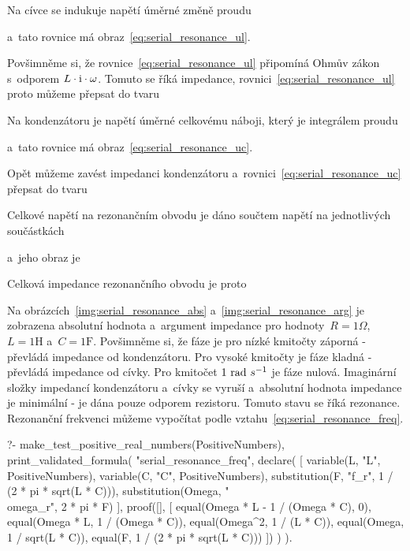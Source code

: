 
Na cívce se indukuje napětí úměrné změně proudu


a~tato rovnice má obraz~\eqref{eq:serial_resonance_ul}.


Povšimněme si, že rovnice~\eqref{eq:serial_resonance_ul} připomíná Ohmův zákon s~odporem \(L \cdot \mathrm{i} \cdot \omega\). Tomuto  se říká impedance, rovnici~\eqref{eq:serial_resonance_ul} proto můžeme přepsat do tvaru


Na kondenzátoru je napětí úměrné celkovému náboji, který je integrálem proudu


a~tato rovnice má obraz~\eqref{eq:serial_resonance_uc}.


Opět můžeme zavést impedanci kondenzátoru a~rovnici~\eqref{eq:serial_resonance_uc} přepsat do tvaru


Celkové napětí na rezonančním obvodu je dáno součtem napětí na jednotlivých součástkách


a~jeho obraz je


Celková impedance rezonančního obvodu je proto


Na obrázcích~\ref{img:serial_resonance_abs} a~\ref{img:serial_resonance_arg} je zobrazena absolutní hodnota a~argument impedance pro hodnoty~\(R = 1\Omega\), \(L = 1\mathrm{H}\) a~\(C = 1\mathrm{F}\). Povšimněme si, že fáze je pro nízké kmitočty záporná - převládá impedance od kondenzátoru. Pro vysoké kmitočty je fáze kladná - převládá impedance od cívky. Pro kmitočet \(1 \ \rad \ s^{-1}\) je fáze nulová. Imaginární složky impedancí kondenzátoru a~cívky se vyruší a~absolutní hodnota impedance je minimální - je dána pouze odporem rezistoru. Tomuto stavu se říká rezonance. Rezonanční frekvenci můžeme vypočítat podle vztahu~\eqref{eq:serial_resonance_freq}.

\begin{prolog}
?-	make_test_positive_real_numbers(PositiveNumbers),
	print_validated_formula(
		"serial_resonance_freq",
		declare(
			[
				variable(L, "L", PositiveNumbers),
				variable(C, "C", PositiveNumbers),
				substitution(F, "f_r", 1 / (2 * pi * sqrt(L * C))),
				substitution(Omega, "\\omega_r", 2 * pi * F)
			],
			proof([],
			[
				equal(Omega * L - 1 / (Omega * C), 0),
				equal(Omega * L, 1 / (Omega * C)),
				equal(Omega^2, 1 / (L * C)),
				equal(Omega, 1 / sqrt(L * C)),
				equal(F, 1 / (2 * pi * sqrt(L * C)))
			])
		)
	).
\end{prolog}


